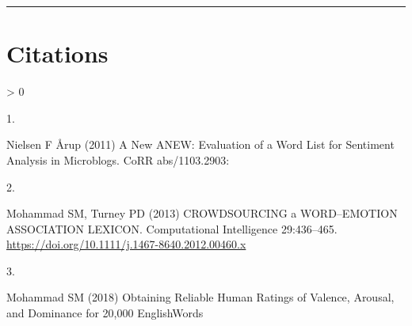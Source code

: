 \documentclass[
]{article}
\newlength{\cslhangindent}
\newlength{\csllabelwidth}
\newenvironment{CSLReferences}[2] %
 {%
  \setlength{\parindent}{0pt}
  \ifodd #1 \everypar{\setlength{\hangindent}{\cslhangindent}}\ignorespaces\fi
  \ifnum #2 > 0
  \setlength{\parskip}{#2\baselineskip}
  \fi
 }%
 {}
\newcommand{\CSLLeftMargin}[1]{\parbox[t]{\csllabelwidth}{#1}}
\newcommand{\CSLRightInline}[1]{\parbox[t]{\linewidth - \csllabelwidth}{#1}\break}
\begin{document}
\begin{center}\rule{0.5\linewidth}{0.5pt}\end{center}

\hypertarget{citations}{%
\section*{Citations}\label{citations}}

\hypertarget{refs}{}
\begin{CSLReferences}{0}{0}
\leavevmode\hypertarget{ref-DBLP:journalsux2fcorrux2fabs-1103-2903}{}%
\CSLLeftMargin{1. }
\CSLRightInline{Nielsen F Årup (2011) A New {ANEW:} Evaluation of a Word
List for Sentiment Analysis in Microblogs. CoRR abs/1103.2903:}

\leavevmode\hypertarget{ref-mohammad13}{}%
\CSLLeftMargin{2. }
\CSLRightInline{Mohammad SM, Turney PD (2013) CROWDSOURCING a
WORD--EMOTION ASSOCIATION LEXICON. Computational Intelligence
29:436--465. \url{https://doi.org/10.1111/j.1467-8640.2012.00460.x}}

\leavevmode\hypertarget{ref-vad-acl2018}{}%
\CSLLeftMargin{3. }
\CSLRightInline{Mohammad SM (2018) Obtaining Reliable Human Ratings of
Valence, Arousal, and Dominance for 20,000 EnglishWords}

\end{CSLReferences}
\end{document}
